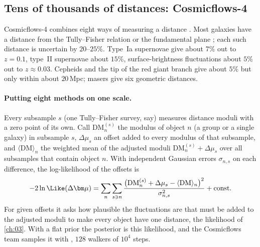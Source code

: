 \subsection{Tens of thousands of distances: Cosmicflows-4}
\label{11c:sec:research-cf4}

Cosmicflows-4 combines eight ways of measuring a distance \cite[Sec.~1]{Tully2023CF4}.
Most galaxies have a distance from the Tully--Fisher relation  or the fundamental plane ; each such distance is uncertain by $20$--$25\%$. Type~Ia supernovae give
about $7\%$ out to $z=0.1$, type~II supernovae about $15\%$, surface-brightness
fluctuations about $5\%$ out to $z\approx0.03$. Cepheids and the tip of the red giant
branch give about $5\%$ but only within about $20$\,Mpc; masers give six geometric
distances.

\paragraph{Putting eight methods on one scale.} Every subsample $s$ (one Tully--Fisher
survey, say) measures distance moduli with a zero point of its own. Call
$\mathrm{DM}^{(s)}_n$ the modulus of object $n$ (a group or a single galaxy) in
subsample $s$, $\Delta\mu_s$ an offset added to every modulus of that subsample, and
$\langle\mathrm{DM}\rangle_n$ the weighted mean of the adjusted moduli
$\mathrm{DM}^{(s)}_n+\Delta\mu_s$ over all subsamples that contain object $n$. With
independent Gaussian errors $\sigma_{n,s}$ on each difference, the log-likelihood of
the offsets is \cite[eqs.~(1)--(2)]{Tully2023CF4}
\begin{equation}
  -2\ln\Like(\Delta\bm\mu)
  =\sum_n\sum_{s\ni n}\frac{\bigl(\mathrm{DM}^{(s)}_n+\Delta\mu_s-\langle\mathrm{DM}\rangle_n\bigr)^2}{\sigma_{n,s}^2}
  +\text{const}.
  \label{11c:eq:cf4-like}
\end{equation}
For given offsets it asks how plausible the fluctuations are that must be added to the
adjusted moduli to make every object have one distance, the likelihood of
\cref{ch:03}. With a flat prior the posterior is this likelihood, and the
Cosmicflows team samples it with , $128$ walkers of $10^4$ steps.

